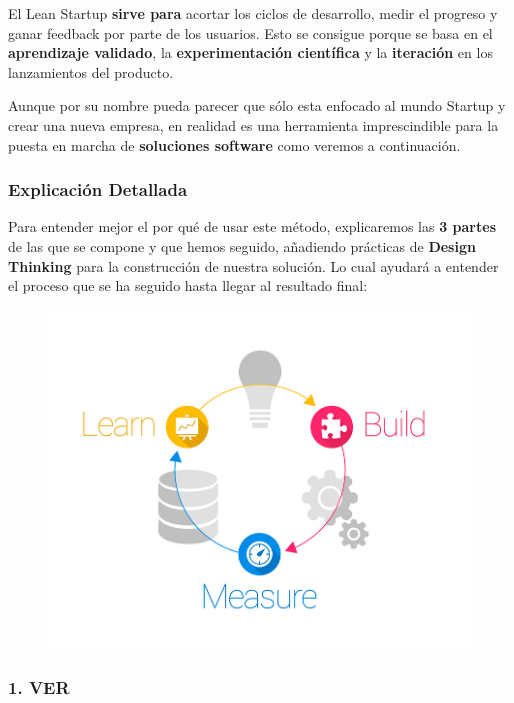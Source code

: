 \documentclass[12pt,twoside,titlepage]{report}
\begin{document}
El Lean Startup \textbf{sirve para} acortar los ciclos de desarrollo, medir el progreso y ganar feedback por parte de los usuarios. Esto se consigue porque se basa en el \textbf{aprendizaje validado}, la \textbf{experimentación científica} y la \textbf{iteración} en los lanzamientos del producto. 

Aunque por su nombre pueda parecer que sólo esta enfocado al mundo Startup y crear una nueva empresa, en realidad es una herramienta imprescindible para la puesta en marcha de \textbf{soluciones software} como veremos a continuación.

\subsubsection{Explicación Detallada}

Para entender mejor el por qué de usar este método, explicaremos las \textbf{3 partes} de las que se compone y que hemos seguido, añadiendo prácticas de \textbf{Design Thinking} para la construcción de nuestra solución. Lo cual ayudará a entender el proceso que se ha seguido hasta llegar al resultado final:


\begin{figure}[H]
    \centering
    \includegraphics[scale=0.3]{leanstartup}
    \label{fig:Circuito de feedback de informacion}
\end{figure}

\subsubsection{1. VER}
\end{document}

